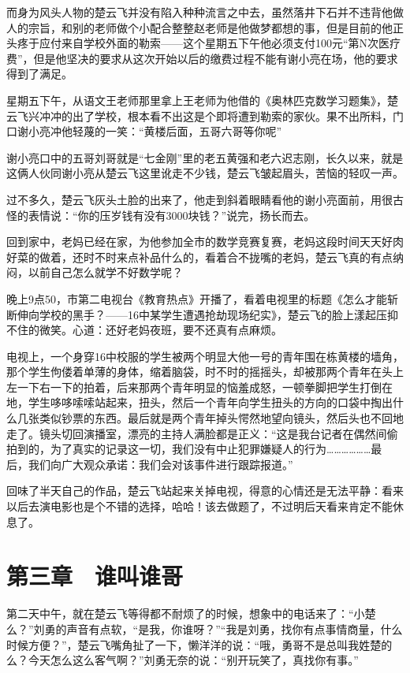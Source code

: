 而身为风头人物的楚云飞并没有陷入种种流言之中去，虽然落井下石并不违背他做人的宗旨，和别的老师做个小配合整整赵老师是他做梦都想的事，但是目前的他正头疼于应付来自学校外面的勒索——这个星期五下午他必须支付100元“第N次医疗费”，但是他坚决的要求从这次开始以后的缴费过程不能有谢小亮在场，他的要求得到了满足。

星期五下午，从语文王老师那里拿上王老师为他借的《奥林匹克数学习题集》，楚云飞兴冲冲的出了学校，根本看不出这是个即将遭到勒索的家伙。果不出所料，门口谢小亮冲他轻蔑的一笑：“黄楼后面，五哥六哥等你呢”

谢小亮口中的五哥刘哥就是“七金刚”里的老五黄强和老六迟志刚，长久以来，就是这俩人伙同谢小亮从楚云飞这里讹走不少钱，楚云飞皱起眉头，苦恼的轻叹一声。

过不多久，楚云飞灰头土脸的出来了，他走到斜着眼睛看他的谢小亮面前，用很古怪的表情说：“你的压岁钱有没有3000块钱？”说完，扬长而去。

回到家中，老妈已经在家，为他参加全市的数学竞赛复赛，老妈这段时间天天好肉好菜的做着，还时不时来点补品什么的，看着合不拢嘴的老妈，楚云飞真的有点纳闷，以前自己怎么就学不好数学呢？

晚上9点50，市第二电视台《教育热点》开播了，看着电视里的标题《怎么才能斩断伸向学校的黑手？——16中某学生遭遇抢劫现场纪实》，楚云飞的脸上漾起压抑不住的微笑。心道：还好老妈夜班，要不还真有点麻烦。

电视上，一个身穿16中校服的学生被两个明显大他一号的青年围在栋黄楼的墙角，那个学生佝偻着单薄的身体，缩着脑袋，时不时的摇摇头，却被那两个青年在头上左一下右一下的拍着，后来那两个青年明显的恼羞成怒，一顿拳脚把学生打倒在地，学生哆哆嗦嗦站起来，扭头，然后一个青年向学生扭头的方向的口袋中掏出什么几张类似钞票的东西。最后就是两个青年掉头愕然地望向镜头，然后头也不回地走了。镜头切回演播室，漂亮的主持人满脸都是正义：“这是我台记者在偶然间偷拍到的，为了真实的记录这一切，我们没有中止犯罪嫌疑人的行为………………最后，我们向广大观众承诺：我们会对该事件进行跟踪报道。”

回味了半天自己的作品，楚云飞站起来关掉电视，得意的心情还是无法平静：看来以后去演电影也是个不错的选择，哈哈！该去做题了，不过明后天看来肯定不能休息了。

\section{第三章　谁叫谁哥}

第二天中午，就在楚云飞等得都不耐烦了的时候，想象中的电话来了：“小楚么？”刘勇的声音有点软，“是我，你谁呀？”“我是刘勇，找你有点事情商量，什么时候方便？”，楚云飞嘴角扯了一下，懒洋洋的说：“哦，勇哥不是总叫我姓楚的么？今天怎么这么客气啊？”刘勇无奈的说：“别开玩笑了，真找你有事。”


